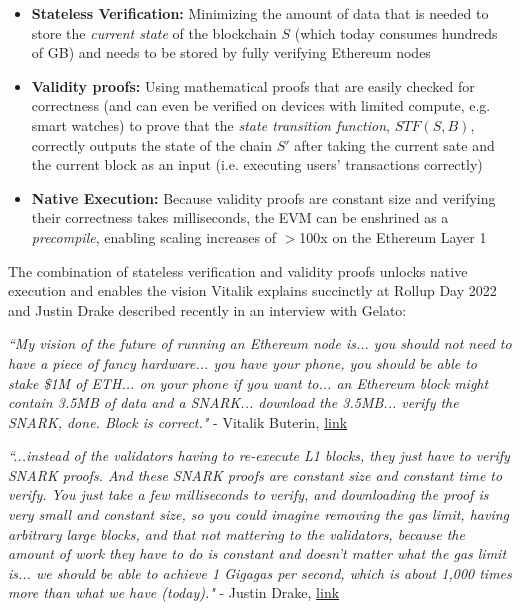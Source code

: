 \documentclass[12pt]{article}
\begin{document}
\begin{itemize}
    \item \textbf{Stateless Verification:} Minimizing the amount of data that is needed to store the \textit{current state} of the blockchain $S$ (which today consumes hundreds of GB) and needs to be stored by fully verifying Ethereum nodes
    \item \textbf{Validity proofs:} Using mathematical proofs that are easily checked for correctness (and can even be verified on devices with limited compute, e.g. smart watches) to prove that the \textit{state transition function}, $STF( S,B)$, correctly outputs the state of the chain $S'$ after taking the current sate and the current block as an input (i.e. executing users' transactions correctly)
    \item \textbf{Native Execution:} Because validity proofs are constant size and verifying their correctness takes milliseconds, the EVM can be enshrined as a \textit{precompile}, enabling scaling increases of $>$100x on the Ethereum Layer 1
\end{itemize}

The combination of stateless verification and validity proofs unlocks native execution and enables the vision Vitalik explains succinctly at Rollup Day 2022 and Justin Drake described recently in an interview with Gelato:

\begin{center}
\textit{``My vision of the future of running an Ethereum node is... you should not need to have a piece of fancy hardware... you have your phone, you should be able to stake \$1M of ETH... on your phone if you want to... an Ethereum block might contain 3.5MB of data and a SNARK... download the 3.5MB... verify the SNARK, done. Block is correct."} - Vitalik Buterin, \href{https://youtu.be/6hfVzCWT6YI?si=cubN-8mEUoNr3n_z&t=1409}{link}
\end{center}

\begin{center}
    \textit{``...instead of the validators having to re-execute L1 blocks, they just have to verify SNARK proofs. And these SNARK proofs are constant size and constant time to verify. You just take a few milliseconds to verify, and downloading the proof is very small and constant size, so you could imagine removing the gas limit, having arbitrary large blocks, and that not mattering to the validators, because the amount of work they have to do is constant and doesn't matter what the gas limit is... we should be able to achieve 1 Gigagas per second, which is about 1,000 times more than what we have (today)."} - Justin Drake, \href{https://youtu.be/0q-qT67yyVs?si=cIWbDG-6zHFDh-hS&t=1196}{link}
\end{center}
\end{document}
